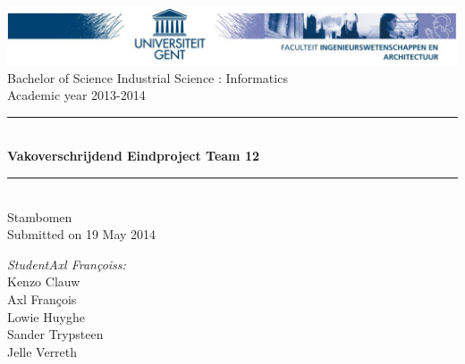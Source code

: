 \documentclass[pdftex,a4paper,12pt,twoside]{report}
\newcommand{\HRule}{\rule{\linewidth}{0.5mm}}
\newcommand{\studenta}{Kenzo Clauw}
\newcommand{\studentb}{Axl Fran\c{c}ois}
\newcommand{\studentc}{Lowie Huyghe}
\newcommand{\studentd}{Sander Trypsteen}
\newcommand{\studente}{Jelle Verreth}
\newcommand{\titel}{Vakoverschrijdend Eindproject Team 12}
\newcommand{\ondertitel}{Stambomen}
\newcommand{\datum}{19 May 2014}
\newcommand{\academiejaar}{2013-2014}
\begin{document}

\begin{titlepage}
\begin{center}
\includegraphics[width=\textwidth]{images/header.jpg}\\[.5cm]
Bachelor of Science Industrial Science : Informatics\\
Academic year \academiejaar

\vfill

\HRule \\[0.4cm]
{ \huge \bfseries \titel}\\[0.4cm]
\HRule \\[0.4cm]

{\Large \ondertitel}\\[0.4cm]

Submitted on \datum

\vfill

\begin{minipage}{0.49\textwidth}
\begin{flushleft}
\emph{Student\ifdefined\studentb s\fi :}\\
\studenta \\
\studentb \\
\studentc \\
\studentd \\
\studente
\par
\end{flushleft}
\end{minipage}
\begin{minipage}{0.49\textwidth}
\begin{flushright}
\end{flushright}
\end{minipage}

\end{center}

\end{titlepage}

\end{document}
